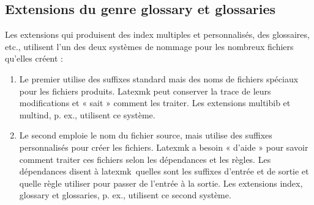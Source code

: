 \documentclass[11pt,french]{article}
\newcommand{\TS}{\textsf{\TeX Shop}}
\newcommand{\latexmk}{\textsf{latexmk}}
\newcommand{\cmd}[1]{\textsf{#1}}
\begin{document}

%
%


\subsection{Extensions du genre \cmd{glossary} et \cmd{glossaries}}

Les extensions qui produisent des index multiples et personnalisés, des glossaires, etc., utilisent l'un des deux systèmes de nommage pour les nombreux fichiers qu'elles créent :
\begin{enumerate}
\item 
Le premier utilise des suffixes standard mais des noms de fichiers spéciaux pour les fichiers produits. \cmd{Latexmk} peut conserver la trace de leurs modifications et « sait » comment les traiter. Les extensions \cmd{multibib} et \cmd{multind}, p. ex., utilisent ce système.
\item 
Le second emploie le nom du fichier source, mais utilise des suffixes personnalisés pour créer les fichiers. \cmd{Latexmk} a besoin « d'aide » pour savoir comment traiter ces fichiers selon les dépendances et les règles. Les dépendances disent à \latexmk\ quelles sont les suffixes d'entrée et de sortie et quelle règle utiliser pour passer de l'entrée à la sortie. Les extensions \cmd{index}, \cmd{glossary} et \cmd{glossaries}, p. ex., utilisent ce second système.
\end{enumerate}
\end{document}
